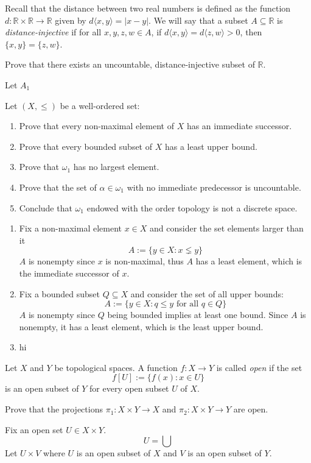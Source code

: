 \documentclass[../main.tex]{subfiles}
\begin{document}
\begin{problem}[8]
    Recall that the distance between two real numbers is defined as the function $d: \mathbb{R} \times \mathbb{R} \to \mathbb{R}$ given by $d\langle x, y \rangle = |x - y|$.
    We will say that a subset $A \subseteq \mathbb{R}$ is \textit{distance-injective} if for all $x, y, z, w \in A$, if $d\langle x, y \rangle = d\langle z, w \rangle > 0$, then $\{ x, y \} = \{z, w \}$.

    Prove that there exists an uncountable, distance-injective subset of $\mathbb{R}$.
\end{problem}
Let $A_1$ 

\begin{problem}[9]
    Let $(X, \le)$ be a well-ordered set:
    \begin{enumerate}[label=(\alph*)]
        \item Prove that every non-maximal element of $X$ has an immediate successor.
        \item Prove that every bounded subset of $X$ has a least upper bound.
        \item Prove that $\omega_1$ has no largest element.
        \item Prove that the set of $\alpha \in \omega_1$ with no immediate predecessor is uncountable.
        \item Conclude that $\omega_1$ endowed with the order topology is not a discrete space.
    \end{enumerate}
\end{problem}
\begin{enumerate}[label=(\alph*)]
    \item Fix a non-maximal element $x \in X$ and consider the set elements larger than it
        \[
            A := \{ y \in X : x \lneq y \}
        \]
        $A$ is nonempty since $x$ is non-maximal, thus $A$ has a least element, which is the immediate successor of $x$.
    \item Fix a bounded subset $Q \subseteq X$ and consider the set of all upper bounds:
        \[
            A := \{ y \in X : q \le y \text{ for all } q \in Q \}
        \]
        $A$ is nonempty since $Q$ being bounded implies at least one bound.
        Since $A$ is nonempty, it has a least element, which is the least upper bound.
    \item hi
\end{enumerate}


\begin{problem}[10]
    Let $X$ and $Y$ be topological spaces.
    A function $f : X \to Y$ is called \textit{open} if the set
    \[
        f[U] := \{ f(x) : x \in U \}
    \]
    is an open subset of $Y$ for every open subset $U$ of $X$.

    Prove that the projections $\pi_1 : X \times Y \to X$ and $\pi_2 : X \times Y \to Y$ are open.
\end{problem}
Fix an open set $U \in X \times Y$.
\[
    U = \bigcup
\]
Let $U \times V$ where $U$ is an open subset of $X$ and $V$ is an open subset of $Y$.
\end{document}
